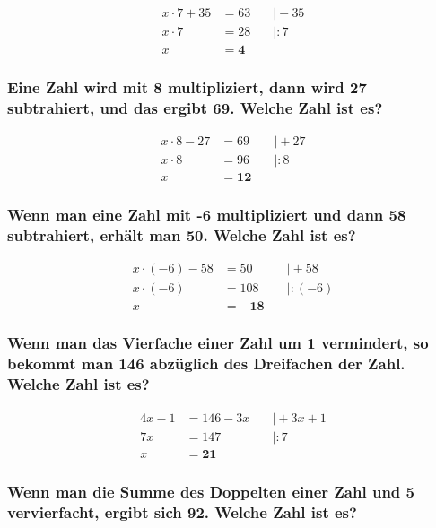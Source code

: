 \documentclass[a4paper,10pt]{article} %
\begin{document}
\[
  \begin{aligned}
    x \cdot 7 + 35 &= 63 &\quad\big| - 35 \\
    x \cdot 7 &= 28 &\quad\big| : 7 \\
    x &= \mathbf{4}
  \end{aligned}
\]

\subsubsection{Eine Zahl wird mit 8 multipliziert, dann wird 27 subtrahiert,
  und das ergibt 69. Welche Zahl ist es?} %

\[
  \begin{aligned}
    x \cdot 8 - 27 &= 69 &\quad\big| + 27 \\
    x \cdot 8 &= 96 &\quad\big| : 8 \\
    x &= \mathbf{12}
  \end{aligned}
\]

\subsubsection{Wenn man eine Zahl mit -6 multipliziert und dann 58 subtrahiert,
  erhält man 50. Welche Zahl ist es?} %

\[
  \begin{aligned}
    x \cdot (-6) - 58 &= 50 &\quad\big| + 58 \\
    x \cdot (-6) &= 108 &\quad\big| : (-6) \\
    x &= \mathbf{-18}
  \end{aligned}
\]

\subsubsection{Wenn man das Vierfache einer Zahl um 1 vermindert,
  so bekommt man 146 abzüglich des Dreifachen der Zahl. Welche Zahl ist es?} %

\[
  \begin{aligned}
    4x - 1 &= 146 - 3x &\quad\big| + 3x + 1 \\
    7x &= 147 &\quad\big| : 7 \\
    x &= \mathbf{21}
  \end{aligned}
\]

\subsubsection{Wenn man die Summe des Doppelten einer Zahl und 5 vervierfacht,
  ergibt sich 92. Welche Zahl ist es?} %
\end{document}
